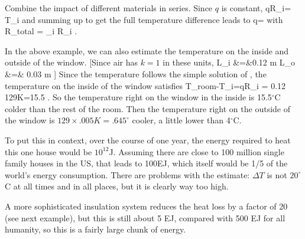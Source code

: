 \documentclass[11pt]{book}
\begin{document}
Combine the impact of different materials in series. Since $q$ is constant,
\be
qR_i= \Delta T_i
\ee
and summing up to get the full temperature difference leads to
\be
q=\ee
with
\be
R_{total} = \sum_i R_i
.\ee
{}

In the above example, we can also estimate the temperature on the inside and outside of the window. [Since air has $k=1$ in these units, 
\bea
L_i &=&0.12 m\vs
L_o &=& 0.03 m
\eea]
Since the temperature follows the simple solution of , the temperature on the inside of the window
satisfies
\be
T_{\rm room}-T_i=qR_i = 0.12 \times 129K=15.5
.\ee
So the temperature right on the window in the inside is 15.5$^\circ$C colder than the rest of the room. Then the temperature right on the outside of the window is $129\times .005K=.645^\circ$ cooler, a little lower than 4$^\circ$C.

To put this in context, over the course of one year, the energy required to heat this one house would be $10^{12}$J. Assuming there are close to 100 million single family houses in the US, that leads to 100EJ, which itself would be 1/5 of the world's energy consumption. There are problems with the estimate: $\Delta T$ is not $20^\circ$C at all times and in all places, but it is clearly way too high. 

A more sophisticated insulation system reduces the heat loss by a factor of 20 (see next example), but this is still about 5 EJ, compared with 500 EJ for all humanity, so this is a fairly large chunk of energy.
\end{document}
